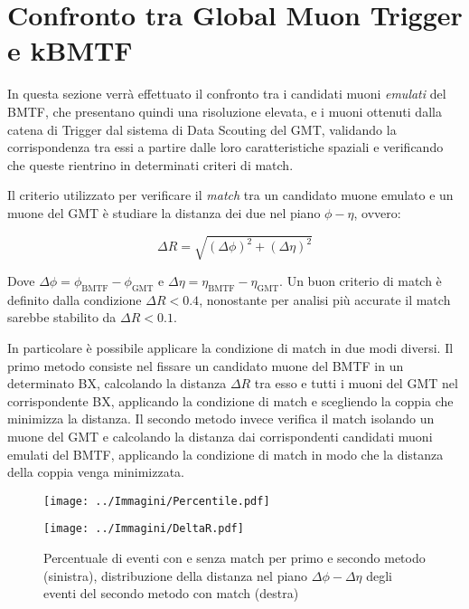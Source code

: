 \section{Confronto tra Global Muon Trigger e kBMTF}
\label{sec:Confronto}

In questa sezione verrà effettuato il confronto tra i candidati muoni \textit{emulati} del BMTF, che presentano quindi una risoluzione elevata, e i muoni ottenuti dalla catena di Trigger dal sistema di Data Scouting del GMT, validando la corrispondenza tra essi a partire dalle loro caratteristiche spaziali e verificando che queste rientrino in determinati criteri di match. 

Il criterio utilizzato per verificare il \textit{match} tra un candidato muone emulato e un muone del GMT è studiare la distanza dei due nel piano $\phi - \eta$, ovvero:

\begin{equation}
  \label{eq:DeltaR}
  \Delta R = \sqrt{(\Delta \phi)^2 + (\Delta \eta)^2}
\end{equation}

Dove $\Delta \phi = \phi_{\mathrm{BMTF}} - \phi_{\mathrm{GMT}}$ e $\Delta \eta = \eta_{\mathrm{BMTF}} - \eta_{\mathrm{GMT}}$. Un buon criterio di match è definito dalla condizione $\Delta R < 0.4$, nonostante per analisi più accurate il match sarebbe stabilito da $\Delta R < 0.1$.

In particolare è possibile applicare la condizione di match in due modi diversi. Il primo metodo consiste nel fissare un candidato muone del BMTF in un determinato BX, calcolando la distanza $\Delta R$ tra esso e tutti i muoni del GMT nel corrispondente BX, applicando la condizione di match e scegliendo la coppia che minimizza la distanza. \newline
Il secondo metodo invece verifica il match isolando un muone del GMT e calcolando la distanza dai corrispondenti candidati muoni emulati del BMTF, applicando la condizione di match in modo che la distanza della coppia venga minimizzata.




\begin{figure}[t]
  \centering
  \begin{minipage}[b]{0.45\textwidth}
    \centering
    \texttt{[image: ../Immagini/Percentile.pdf]} 
    \end{minipage}
    \hfill 
    \begin{minipage}[b]{0.49\textwidth}
      \centering
      \texttt{[image: ../Immagini/DeltaR.pdf]} 
    \end{minipage}
    \caption{Percentuale di eventi con e senza match per primo e secondo metodo (sinistra), distribuzione della distanza nel piano $\Delta \phi - \Delta \eta$ degli eventi del secondo metodo con match (destra)}
  \label{fig:DeltaR}
\end{figure}


